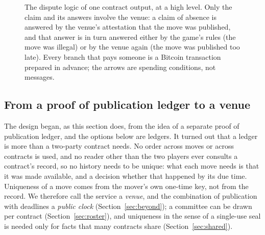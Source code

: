 \documentclass[11pt]{article}
\begin{document}
\begin{figure}[H]
\caption{The dispute logic of one contract output, at a high level. Only
the claim and its answers involve the venue: a claim of absence is
answered by the venue's attestation that the move was published, and
that answer is in turn answered either by the game's rules (the move was
illegal) or by the venue again (the move was published too late). Every
branch that pays someone is a Bitcoin transaction prepared in advance;
the arrows are spending conditions, not messages.}
\label{fig:highlevel}
\end{figure}


\subsection{From a proof of publication ledger to a venue}

The design began, as this section does, from the idea of a separate
proof of publication ledger, and the options below are ledgers. It
turned out that a ledger is more than a two-party contract needs. No
order across moves or across contracts is used, and no reader other
than the two players ever consults a contract's record, so no history
needs to be unique: what each move needs is that it was made available,
and a decision whether that happened by its due time. Uniqueness of a
move comes from the mover's own one-time key, not from the record. We
therefore call the service a \emph{venue}, and the combination of
publication with deadlines a \emph{public clock}
(Section~\ref{sec:beyond}); a committee can be drawn per contract
(Section~\ref{sec:roster}), and uniqueness in the sense of a
single-use seal is needed only for facts that many contracts share
(Section~\ref{sec:shared}).
\end{document}
